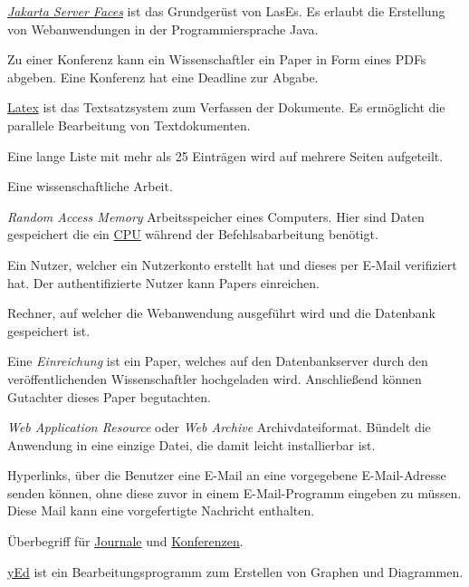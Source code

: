 \begin{description}
	 \href{https://jakarta.ee/specifications/faces/}{\emph{Jakarta Server Faces}} ist das Grundgerüst von LasEs. Es erlaubt die Erstellung von Webanwendungen in der Programmiersprache Java.

	 Zu einer Konferenz kann ein Wissenschaftler ein Paper in Form eines PDFs abgeben. Eine Konferenz hat eine Deadline zur Abgabe.

	 \href{https://www.latex-project.org/}{Latex} ist das Textsatzsystem zum Verfassen der Dokumente. Es ermöglicht die parallele Bearbeitung von Textdokumenten.

	 Eine lange Liste mit mehr als 25 Einträgen wird auf mehrere Seiten aufgeteilt.

	 Eine wissenschaftliche Arbeit.

	 \emph{Random Access Memory} Arbeitsspeicher eines Computers. Hier sind Daten gespeichert die ein \hyperref[glo:cpu]{CPU} während der Befehlsabarbeitung benötigt.

	 Ein Nutzer, welcher ein Nutzerkonto erstellt hat und dieses per E-Mail verifiziert hat. Der authentifizierte Nutzer kann Papers einreichen.

	 Rechner, auf welcher die Webanwendung ausgeführt wird und die Datenbank gespeichert ist.

	 Eine \emph{Einreichung} ist ein Paper, welches auf den Datenbankserver durch den veröffentlichenden Wissenschaftler hochgeladen wird. Anschließend können Gutachter dieses Paper begutachten.

	 \emph{Web Application Resource} oder \emph{Web Archive} Archivdateiformat. Bündelt die Anwendung in eine einzige Datei, die damit leicht installierbar ist.

	 Hyperlinks, über die Benutzer eine E-Mail an eine vorgegebene E-Mail-Adresse senden können, ohne diese zuvor in einem E-Mail-Programm eingeben zu müssen. Diese Mail kann eine vorgefertigte Nachricht enthalten.

	 Überbegriff für \hyperref[glo:journal]{Journale} und \hyperref[glo:konf]{Konferenzen}.

	 \href{https://www.yworks.com/products/yed}{yEd} ist ein Bearbeitungsprogramm zum Erstellen von Graphen und Diagrammen.
\end{description}